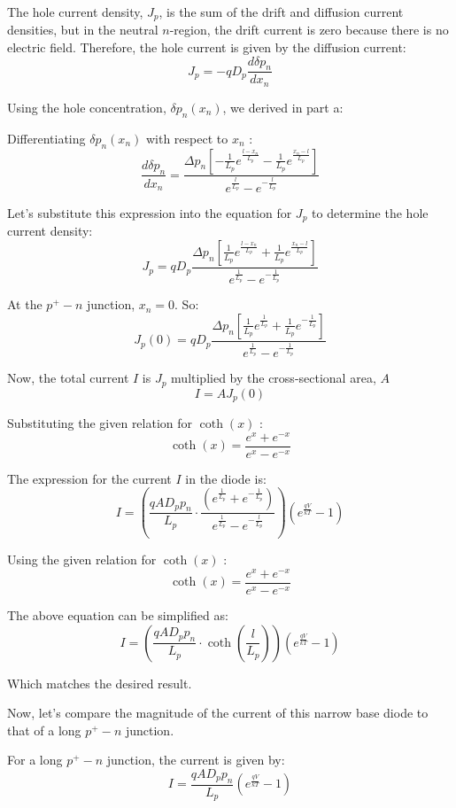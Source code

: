 The hole current density, $J_p$, is the sum of the drift and diffusion current densities, but in the neutral $n$-region, the drift current is zero because there is no electric field. Therefore, the hole current is given by the diffusion current:
$$
J_p=-q D_p \frac{d \delta p_n}{d x_n}
$$

Using the hole concentration, $\delta p_n\left(x_n\right)$, we derived in part a:

Differentiating $\delta p_n\left(x_n\right)$ with respect to $x_n$ :
$$
\frac{d \delta p_n}{d x_n}=\frac{\Delta p_n\left[-\frac{1}{L_p} e^{\frac{l-x_n}{L_p}}-\frac{1}{L_p} e^{\frac{x_n-l}{L_p}}\right]}{e^{\frac{l}{L_p}}-e^{-\frac{l}{L_p}}}
$$

Let's substitute this expression into the equation for $J_p$ to determine the hole current density:
$$
J_p=q D_p \frac{\Delta p_n\left[\frac{1}{L_p} e^{\frac{l-x_n}{L_p}}+\frac{1}{L_p} e^{\frac{x_n-l}{L_p}}\right]}{e^{\frac{1}{L_p}}-e^{-\frac{1}{L_p}}}
$$

At the $p^{+}-n$ junction, $x_n=0$. So:
$$
J_p(0)=q D_p \frac{\Delta p_n\left[\frac{1}{L_p} e^{\frac{1}{L_p}}+\frac{1}{L_p} e^{-\frac{1}{L_p}}\right]}{e^{\frac{1}{L_p}}-e^{-\frac{1}{L_p}}}
$$

Now, the total current $I$ is $J_p$ multiplied by the cross-sectional area, $A$
$$
I=A J_p(0)
$$

Substituting the given relation for $\operatorname{coth}(x)$ :
$$
\operatorname{coth}(x)=\frac{e^x+e^{-x}}{e^x-e^{-x}}
$$

The expression for the current $I$ in the diode is:
$$
I=\left(\frac{q A D_p p_n}{L_p} \cdot \frac{\left(e^{\frac{1}{L_p}}+e^{-\frac{1}{L_p}}\right)}{e^{\frac{1}{L_p}}-e^{-\frac{l}{L_p}}}\right)\left(e^{\frac{q V}{k T}}-1\right)
$$

Using the given relation for $\operatorname{coth}(x)$ :
$$
\operatorname{coth}(x)=\frac{e^x+e^{-x}}{e^x-e^{-x}}
$$

The above equation can be simplified as:
$$
I=\left(\frac{q A D_p p_n}{L_p} \cdot \operatorname{coth}\left(\frac{l}{L_p}\right)\right)\left(e^{\frac{q V}{k T}}-1\right)
$$

Which matches the desired result.

Now, let's compare the magnitude of the current of this narrow base diode to that of a long $p^{+}-n$ junction.

For a long $p^{+}-n$ junction, the current is given by:
$$
I=\frac{q A D_p p_n}{L_p}\left(e^{\frac{q V}{k T}}-1\right)
$$

